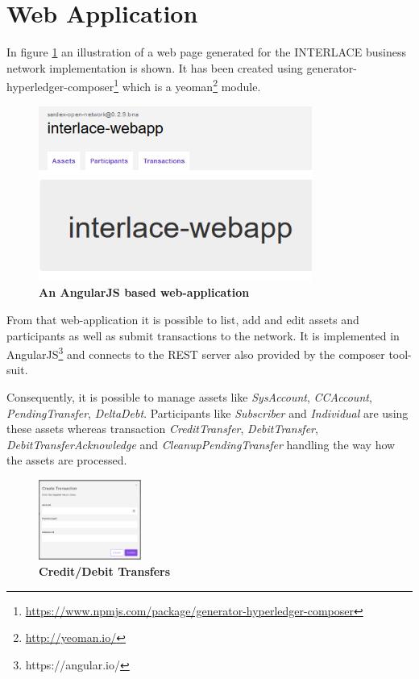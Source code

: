 \section{Web Application}
\label{sec:webapp}

In figure \ref{fig:webapp} an illustration of a web page generated for the INTERLACE business network implementation is shown. It has been created using generator-hyperledger-composer\footnote{\url{https://www.npmjs.com/package/generator-hyperledger-composer}} which is a yeoman\footnote{\url{http://yeoman.io/}} module.

\begin{figure}[htbp]
  \centering
  \includegraphics[width=0.8\textwidth]{Figures/webapp}
  \caption{\bf\small An AngularJS based web-application }
  \label{fig:webapp}
\end{figure}

From that web-application it is possible to list, add and edit assets and participants as well as submit transactions to the network. It is implemented in AngularJS\footnote{https://angular.io/} and connects to the REST server also provided by the composer tool-suit.

Consequently, it is possible to manage assets like \textit{SysAccount}, \textit{CCAccount}, \textit{PendingTransfer}, \textit{DeltaDebt}. Participants like \textit{Subscriber} and \textit{Individual} are using these assets whereas transaction \textit{CreditTransfer}, \textit{DebitTransfer}, \textit{DebitTransferAcknowledge} and \textit{CleanupPendingTransfer} handling the way how the assets are processed.	

\begin{figure}[htbp]
  \centering
  \includegraphics[width=0.3\textwidth]{Figures/webapp-transfer}
  \caption{\bf\small Credit/Debit Transfers }
  \label{fig:webapp-transfer}
\end{figure}

